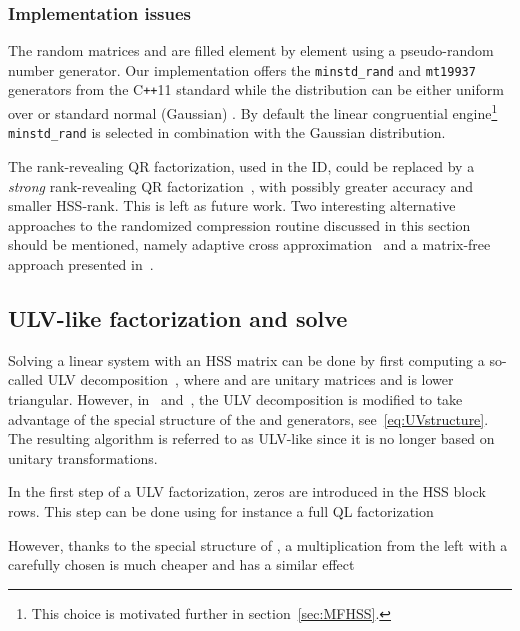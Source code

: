 \documentclass{article}
\newcommand{\ignore}[1]{}
\begin{document}
\subsubsection{Implementation issues}
The random matrices  and  are filled element by element
using a pseudo-random number generator. Our implementation offers the
\verb+minstd_rand+ and \verb+mt19937+ generators from the
C\texttt{++}11 standard while the distribution can be either uniform
over  or standard normal (Gaussian) . By
default the linear congruential engine\footnote{This choice is
  motivated further in section~\ref{sec:MFHSS}.} \verb+minstd_rand+ is
selected in combination with the Gaussian distribution.

\ignore{ Alternatively, so-called \emph{structured} random matrices,
  for instance based on the subsampled randomized Fourier or Hadamard
  transforms~\cite{halko2011finding}, might be considered for
  . Such matrices allow faster  evaluation when  is a dense
  matrix.}

The rank-revealing QR factorization, used in the ID, could be replaced
by a \emph{strong} rank-revealing QR
factorization~\cite{gu1996efficient}, with possibly greater accuracy
and smaller HSS-rank. This is left as future work. Two interesting
alternative approaches to the randomized compression routine discussed
in this section should be mentioned, namely adaptive cross
approximation~\cite{bebendorf2000approximation} and a matrix-free
approach presented in~\cite{lin2011fast}.


\subsection{ULV-like factorization and solve}\label{sec:ULV}
Solving a linear system with an HSS matrix can be done by first
computing a so-called ULV decomposition~\cite{chandrasekaran2006fast},
where  and  are unitary matrices and  is lower
triangular. However, in~\cite{xia2013randomized}
and~\cite{xia2012superfast}, the ULV decomposition is modified to take
advantage of the special structure of the  and 
generators, see~\eqref{eq:UVstructure}. The resulting algorithm is
referred to as ULV-like since it is no longer based on unitary
transformations.

In the first step of a ULV factorization, zeros are introduced in the
HSS block rows. This step can be done using for instance a full QL
factorization

However, thanks to the special structure of , a multiplication
from the left with a carefully chosen  is much cheaper
and has a similar effect
\end{document}
